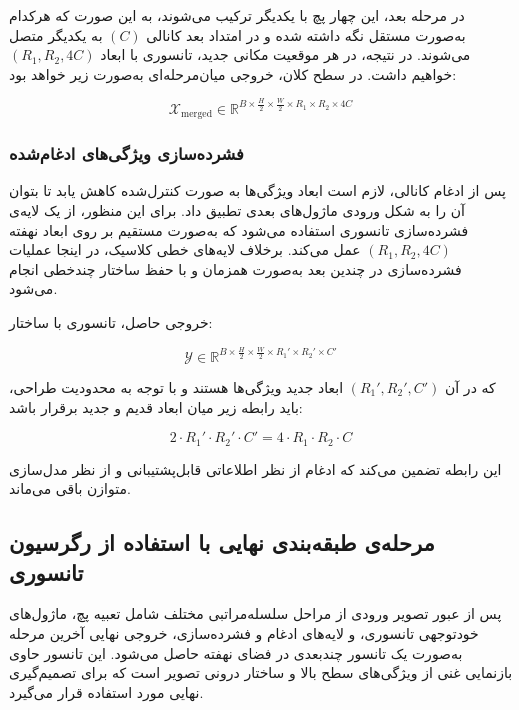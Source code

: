در مرحله بعد، این چهار پچ با یکدیگر ترکیب می‌شوند، به این صورت که هرکدام به‌صورت مستقل نگه داشته شده و در امتداد بعد کانالی $(C)$ به یکدیگر متصل می‌شوند. در نتیجه، در هر موقعیت مکانی جدید، تانسوری با ابعاد $(R_1, R_2, 4C)$ خواهیم داشت. در سطح کلان، خروجی میان‌مرحله‌ای به‌صورت زیر خواهد بود:

\[
\mathcal{X}_{\text{merged}} \in \mathbb{R}^{B \times \frac{H}{2} \times \frac{W}{2} \times R_1 \times R_2 \times 4C}
\]

\subsubsection*{فشرده‌سازی ویژگی‌های ادغام‌شده}

پس از ادغام کانالی، لازم است ابعاد ویژگی‌ها به صورت کنترل‌شده کاهش یابد تا بتوان آن را به شکل ورودی ماژول‌های بعدی تطبیق داد. برای این منظور، از یک لایه‌ی فشرده‌سازی تانسوری استفاده می‌شود که به‌صورت مستقیم بر روی ابعاد نهفته $(R_1, R_2, 4C)$ عمل می‌کند. برخلاف لایه‌های خطی کلاسیک، در اینجا عملیات فشرده‌سازی در چندین بعد به‌صورت همزمان و با حفظ ساختار چندخطی انجام می‌شود.

خروجی حاصل، تانسوری با ساختار:

\[
\mathcal{Y} \in \mathbb{R}^{B \times \frac{H}{2} \times \frac{W}{2} \times R_1' \times R_2' \times C'}
\]

که در آن $(R_1', R_2', C')$ ابعاد جدید ویژگی‌ها هستند و با توجه به محدودیت طراحی، باید رابطه زیر میان ابعاد قدیم و جدید برقرار باشد:



\begin{equation}
	2 \cdot R_1' \cdot R_2' \cdot C' = 4 \cdot R_1 \cdot R_2 \cdot C
\end{equation}

این رابطه تضمین می‌کند که ادغام از نظر اطلاعاتی قابل‌پشتیبانی و از نظر مدل‌سازی متوازن باقی می‌ماند.



\subsection{مرحله‌ی طبقه‌بندی نهایی با استفاده از رگرسیون تانسوری}

پس از عبور تصویر ورودی از مراحل سلسله‌مراتبی مختلف شامل تعبیه پچ، ماژول‌های خودتوجهی تانسوری، و لایه‌های ادغام و فشرده‌سازی، خروجی نهایی آخرین مرحله به‌صورت یک تانسور چندبعدی در فضای نهفته حاصل می‌شود. این تانسور حاوی بازنمایی غنی از ویژگی‌های سطح بالا و ساختار درونی تصویر است که برای تصمیم‌گیری نهایی مورد استفاده قرار می‌گیرد.

